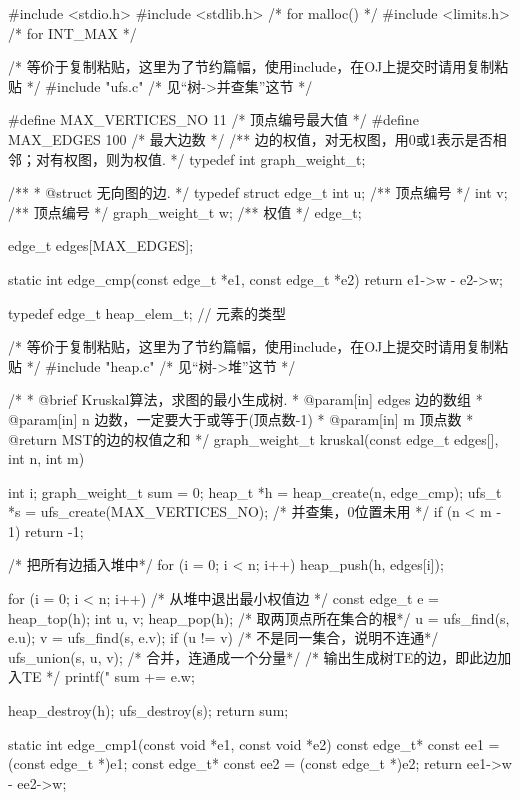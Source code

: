 \begin{Codex}[label=kruskal.c]
#include <stdio.h>
#include <stdlib.h>  /* for malloc() */
#include <limits.h>  /* for INT_MAX */

/* 等价于复制粘贴，这里为了节约篇幅，使用include，在OJ上提交时请用复制粘贴 */
#include "ufs.c"  /* 见“树->并查集”这节 */

#define MAX_VERTICES_NO 11 /* 顶点编号最大值 */
#define MAX_EDGES 100  /* 最大边数 */
/** 边的权值，对无权图，用0或1表示是否相邻；对有权图，则为权值. */
typedef int graph_weight_t;

/**
 * @struct 无向图的边.
 */
typedef struct edge_t{
    int u;  /** 顶点编号 */
    int v;  /** 顶点编号 */
    graph_weight_t w;  /** 权值 */
} edge_t;

edge_t edges[MAX_EDGES];

static int edge_cmp(const edge_t *e1, const edge_t *e2) {
    return e1->w - e2->w;
}

typedef edge_t heap_elem_t; // 元素的类型

/* 等价于复制粘贴，这里为了节约篇幅，使用include，在OJ上提交时请用复制粘贴 */
#include "heap.c"  /* 见“树->堆”这节 */

/*
  * @brief Kruskal算法，求图的最小生成树.
  * @param[in] edges 边的数组
  * @param[in] n 边数，一定要大于或等于(顶点数-1)
  * @param[in] m 顶点数
  * @return MST的边的权值之和
  */
graph_weight_t kruskal(const edge_t edges[], int n, int m) {
    int i;
    graph_weight_t sum = 0;
    heap_t *h = heap_create(n, edge_cmp);
    ufs_t *s = ufs_create(MAX_VERTICES_NO);  /* 并查集，0位置未用  */
    if (n < m - 1) return -1;

    /* 把所有边插入堆中*/
    for (i = 0; i < n; i++) {
        heap_push(h, edges[i]);
    }

    for (i = 0; i < n; i++) {
        /* 从堆中退出最小权值边 */
        const edge_t e = heap_top(h);
        int u, v;
        heap_pop(h);
        /* 取两顶点所在集合的根*/
        u = ufs_find(s, e.u);
        v = ufs_find(s, e.v);
        if (u != v) { /* 不是同一集合，说明不连通*/
            ufs_union(s, u, v); /* 合并，连通成一个分量*/
            /* 输出生成树TE的边，即此边加入TE */
            printf("%
            sum += e.w;
        }
    }

    heap_destroy(h);
    ufs_destroy(s);
    return sum;
}

static int edge_cmp1(const void *e1, const void *e2) {
    const edge_t* const ee1 = (const edge_t *)e1;
    const edge_t* const ee2 = (const edge_t *)e2;
    return ee1->w - ee2->w;
}


\end{Codex}

